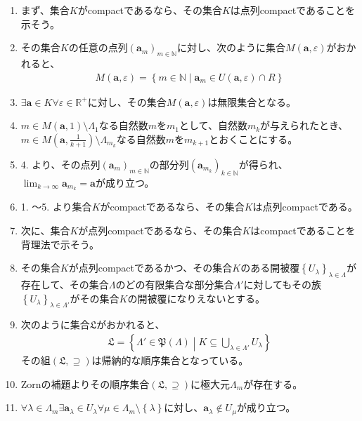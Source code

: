 \documentclass[dvipdfmx]{jsarticle}
\begin{document}
\begin{enumerate}
\item
  まず、集合$K$がcompactであるなら、その集合$K$は点列compactであることを示そう。
\item
  その集合$K$の任意の点列$\left( \mathbf{a}_{m} \right)_{m \in \mathbb{N}}$に対し、次のように集合$M\left( \mathbf{a},\varepsilon \right)$がおかれると、
\begin{align*}
M\left( \mathbf{a},\varepsilon \right) = \left\{ m \in \mathbb{N} \middle| \mathbf{a}_{m} \in U\left( \mathbf{a},\varepsilon \right) \cap R \right\}
\end{align*}
\item
  $\exists\mathbf{a} \in K\forall\varepsilon \in \mathbb{R}^{+}$に対し、その集合$M\left( \mathbf{a},\varepsilon \right)$は無限集合となる。
\item
  $m \in M\left( \mathbf{a},1 \right) \setminus \varLambda_{1}$なる自然数$m$を$m_{1}$として、自然数$m_{k}$が与えられたとき、$m \in M\left( \mathbf{a},\frac{1}{k + 1} \right) \setminus \varLambda_{m_{k}}$なる自然数$m$を$m_{k + 1}$とおくことにする。
\item
  4. より、その点列$\left( \mathbf{a}_{m} \right)_{m \in \mathbb{N}}$の部分列$\left( \mathbf{a}_{m_{k}} \right)_{k \in \mathbb{N}}$が得られ、$\lim_{k \rightarrow \infty}\mathbf{a}_{m_{k}} = \mathbf{a}$が成り立つ。
\item
  1. ～5. より集合$K$がcompactであるなら、その集合$K$は点列compactである。
\item
  次に、集合$K$が点列compactであるなら、その集合$K$はcompactであることを背理法で示そう。
\item
  その集合$K$が点列compactであるかつ、その集合$K$のある開被覆$\left\{ U_{\lambda} \right\}_{\lambda \in \varLambda}$が存在して、その集合$\varLambda$のどの有限集合な部分集合$\varLambda'$に対してもその族$\left\{ U_{\lambda} \right\}_{\lambda \in \varLambda'}$がその集合$K$の開被覆になりえないとする。
\item
  次のように集合$\mathfrak{L}$がおかれると、
\begin{align*}
\mathfrak{L} =\left\{ \varLambda'\in \mathfrak{P}(\varLambda) \middle| K \subseteq \bigcup_{\lambda \in \varLambda'} U_{\lambda} \right\}
\end{align*}
その組$\left( \mathfrak{L, \supseteq} \right)$は帰納的な順序集合となっている。
\item
  Zornの補題よりその順序集合$\left( \mathfrak{L, \supseteq} \right)$に極大元$\varLambda_{m}$が存在する。
\item
  $\forall\lambda \in \varLambda_{m}\exists\mathbf{a}_{\lambda} \in U_{\lambda}\forall\mu \in \varLambda_{m} \setminus \left\{ \lambda \right\}$に対し、$\mathbf{a}_{\lambda} \notin U_{\mu}$が成り立つ。

\end{enumerate}
\end{document}
